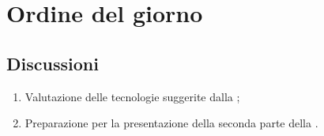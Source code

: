\section{Ordine del giorno} \label{sec:agenda}
\subsection{Discussioni} \label{subsec:discussione}
\begin{enumerate}
    \item Valutazione delle tecnologie suggerite dalla ;
    \item Preparazione per la presentazione della seconda parte della .

    
\end{enumerate}

